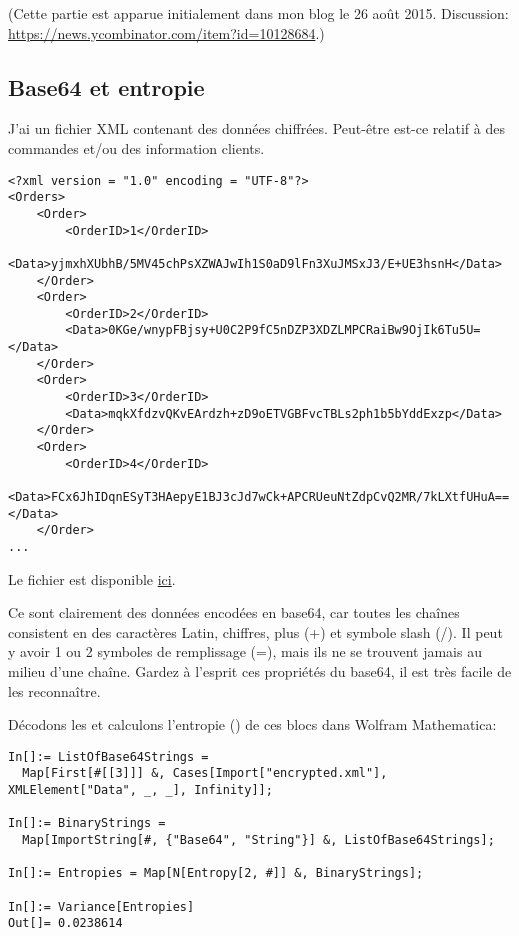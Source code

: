 \label{encrypted_DB1}

(Cette partie est apparue initialement dans mon blog le 26 août 2015.
Discussion: \url{https://news.ycombinator.com/item?id=10128684}.)

\subsection{Base64 et entropie}

J'ai un fichier \ac{XML} contenant des données chiffrées.
Peut-être est-ce relatif à des commandes et/ou des information clients.

\begin{lstlisting}
<?xml version = "1.0" encoding = "UTF-8"?>
<Orders>
	<Order>
		<OrderID>1</OrderID>
		<Data>yjmxhXUbhB/5MV45chPsXZWAJwIh1S0aD9lFn3XuJMSxJ3/E+UE3hsnH</Data>
	</Order>
	<Order>
		<OrderID>2</OrderID>
		<Data>0KGe/wnypFBjsy+U0C2P9fC5nDZP3XDZLMPCRaiBw9OjIk6Tu5U=</Data>
	</Order>
	<Order>
		<OrderID>3</OrderID>
		<Data>mqkXfdzvQKvEArdzh+zD9oETVGBFvcTBLs2ph1b5bYddExzp</Data>
	</Order>
	<Order>
		<OrderID>4</OrderID>
		<Data>FCx6JhIDqnESyT3HAepyE1BJ3cJd7wCk+APCRUeuNtZdpCvQ2MR/7kLXtfUHuA==</Data>
	</Order>
...
\end{lstlisting}

Le fichier est disponible \href{https://raw.githubusercontent.com/DennisYurichev/RE-for-beginners/master/examples/encrypted_DB1/encrypted.xml}{ici}.

Ce sont clairement des données encodées en base64, car toutes les chaînes consistent
en des caractères Latin, chiffres, plus (+) et symbole slash (/).
Il peut y avoir 1 ou 2 symboles de remplissage (=), mais ils ne se trouvent jamais
au milieu d'une chaîne.
Gardez à l'esprit ces propriétés du base64, il est très facile de les reconnaître.

Décodons les et calculons l'entropie () de ces blocs dans Wolfram Mathematica:

\begin{lstlisting}
In[]:= ListOfBase64Strings =
  Map[First[#[[3]]] &, Cases[Import["encrypted.xml"], XMLElement["Data", _, _], Infinity]];

In[]:= BinaryStrings =
  Map[ImportString[#, {"Base64", "String"}] &, ListOfBase64Strings];

In[]:= Entropies = Map[N[Entropy[2, #]] &, BinaryStrings];

In[]:= Variance[Entropies]
Out[]= 0.0238614
\end{lstlisting}

